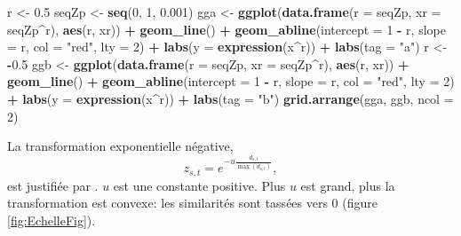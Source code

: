 \documentclass[
  11pt,
  french,
  a4paper,
  extrafontsizes,onecolumn,openright
  ]{memoir}
\newenvironment{Shaded}{\begin{snugshade}}{\end{snugshade}}
\newcommand{\AttributeTok}[1]{\textcolor[rgb]{0.13,0.29,0.53}{#1}}
\newcommand{\DecValTok}[1]{\textcolor[rgb]{0.00,0.00,0.81}{#1}}
\newcommand{\FloatTok}[1]{\textcolor[rgb]{0.00,0.00,0.81}{#1}}
\newcommand{\FunctionTok}[1]{\textcolor[rgb]{0.13,0.29,0.53}{\textbf{#1}}}
\newcommand{\NormalTok}[1]{#1}
\newcommand{\OtherTok}[1]{\textcolor[rgb]{0.56,0.35,0.01}{#1}}
\newcommand{\SpecialCharTok}[1]{\textcolor[rgb]{0.81,0.36,0.00}{\textbf{#1}}}
\newcommand{\StringTok}[1]{\textcolor[rgb]{0.31,0.60,0.02}{#1}}
\begin{document}
\begin{Shaded}
\begin{Highlighting}[]
\NormalTok{r }\OtherTok{\textless{}{-}} \FloatTok{0.5}
\NormalTok{seqZp }\OtherTok{\textless{}{-}} \FunctionTok{seq}\NormalTok{(}\DecValTok{0}\NormalTok{, }\DecValTok{1}\NormalTok{, }\FloatTok{0.001}\NormalTok{)}
\NormalTok{gga }\OtherTok{\textless{}{-}} \FunctionTok{ggplot}\NormalTok{(}\FunctionTok{data.frame}\NormalTok{(}\AttributeTok{r =}\NormalTok{ seqZp, }\AttributeTok{xr =}\NormalTok{ seqZp}\SpecialCharTok{\^{}}\NormalTok{r), }\FunctionTok{aes}\NormalTok{(r, xr)) }\SpecialCharTok{+}
    \FunctionTok{geom\_line}\NormalTok{() }\SpecialCharTok{+} \FunctionTok{geom\_abline}\NormalTok{(}\AttributeTok{intercept =} \DecValTok{1} \SpecialCharTok{{-}}\NormalTok{ r, }\AttributeTok{slope =}\NormalTok{ r, }\AttributeTok{col =} \StringTok{"red"}\NormalTok{,}
    \AttributeTok{lty =} \DecValTok{2}\NormalTok{) }\SpecialCharTok{+} \FunctionTok{labs}\NormalTok{(}\AttributeTok{y =} \FunctionTok{expression}\NormalTok{(x}\SpecialCharTok{\^{}}\NormalTok{r)) }\SpecialCharTok{+} \FunctionTok{labs}\NormalTok{(}\AttributeTok{tag =} \StringTok{"a"}\NormalTok{)}
\NormalTok{r }\OtherTok{\textless{}{-}} \SpecialCharTok{{-}}\FloatTok{0.5}
\NormalTok{ggb }\OtherTok{\textless{}{-}} \FunctionTok{ggplot}\NormalTok{(}\FunctionTok{data.frame}\NormalTok{(}\AttributeTok{r =}\NormalTok{ seqZp, }\AttributeTok{xr =}\NormalTok{ seqZp}\SpecialCharTok{\^{}}\NormalTok{r), }\FunctionTok{aes}\NormalTok{(r, xr)) }\SpecialCharTok{+}
    \FunctionTok{geom\_line}\NormalTok{() }\SpecialCharTok{+} \FunctionTok{geom\_abline}\NormalTok{(}\AttributeTok{intercept =} \DecValTok{1} \SpecialCharTok{{-}}\NormalTok{ r, }\AttributeTok{slope =}\NormalTok{ r, }\AttributeTok{col =} \StringTok{"red"}\NormalTok{,}
    \AttributeTok{lty =} \DecValTok{2}\NormalTok{) }\SpecialCharTok{+} \FunctionTok{labs}\NormalTok{(}\AttributeTok{y =} \FunctionTok{expression}\NormalTok{(x}\SpecialCharTok{\^{}}\NormalTok{r)) }\SpecialCharTok{+} \FunctionTok{labs}\NormalTok{(}\AttributeTok{tag =} \StringTok{"b"}\NormalTok{)}
\FunctionTok{grid.arrange}\NormalTok{(gga, ggb, }\AttributeTok{ncol =} \DecValTok{2}\NormalTok{)}
\end{Highlighting}
\end{Shaded}

\normalsize

La transformation exponentielle négative,
\[z_{s,t} = e^{-u \frac{d_{s,t}}{\max{(d_{s,t})}}},\]
est justifiée par \textcite{Leinster2013}.
\(u\) est une constante positive.
Plus \(u\) est grand, plus la transformation est convexe: les similarités sont tassées vers 0 (figure \ref{fig:EchelleFig}).
\end{document}
